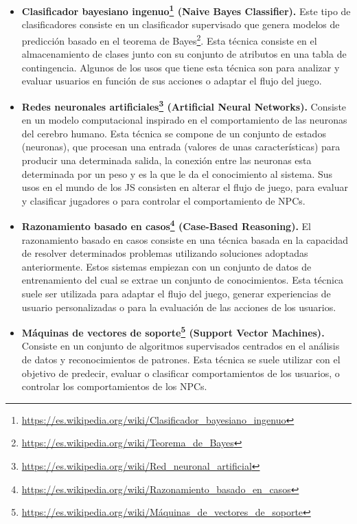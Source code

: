 \begin{itemize}
	\item \textbf{Clasificador bayesiano ingenuo\footnote{\url{https://es.wikipedia.org/wiki/Clasificador\_bayesiano\_ingenuo}} (Naive Bayes Classifier).} Este tipo de clasificadores consiste en un clasificador supervisado que genera modelos de predicción basado en el teorema de Bayes\footnote{\url{https://es.wikipedia.org/wiki/Teorema\_de\_Bayes}}. Esta técnica consiste en el almacenamiento de clases junto con su conjunto de atributos en una tabla de contingencia. Algunos de los usos que tiene esta técnica son para analizar y evaluar usuarios en función de sus acciones o adaptar el flujo del juego.
	\item \textbf{Redes neuronales artificiales\footnote{\url{https://es.wikipedia.org/wiki/Red\_neuronal\_artificial}} (Artificial Neural Networks).} Consiste en un modelo computacional inspirado en el comportamiento de las neuronas del cerebro humano. Esta técnica se compone de un conjunto de estados (neuronas), que procesan una entrada (valores de unas características) para producir una determinada salida, la conexión entre las neuronas esta determinada por un peso y es la que le da el conocimiento al sistema. Sus usos en el mundo de los JS consisten en alterar el flujo de juego, para evaluar y clasificar jugadores o para controlar el comportamiento de NPCs.
	\item \textbf{Razonamiento basado en casos\footnote{\url{https://es.wikipedia.org/wiki/Razonamiento\_basado\_en\_casos}} (Case-Based Reasoning).} El razonamiento basado en casos consiste en una técnica basada en la capacidad de resolver determinados problemas utilizando soluciones adoptadas anteriormente. Estos sistemas empiezan con un conjunto de datos de entrenamiento del cual se extrae un conjunto de conocimientos. Esta técnica suele ser utilizada para adaptar el flujo del juego, generar experiencias de usuario personalizadas o para la evaluación de las acciones de los usuarios.
	\item \textbf{Máquinas de vectores de soporte\footnote{\url{https://es.wikipedia.org/wiki/Máquinas\_de\_vectores\_de\_soporte}} (Support Vector Machines).} Consiste en un conjunto de algoritmos supervisados centrados en el análisis de datos y reconocimientos de patrones. Esta técnica se suele utilizar con el objetivo de predecir, evaluar o clasificar comportamientos de los usuarios, o controlar los comportamientos de los NPCs.
\end{itemize}

